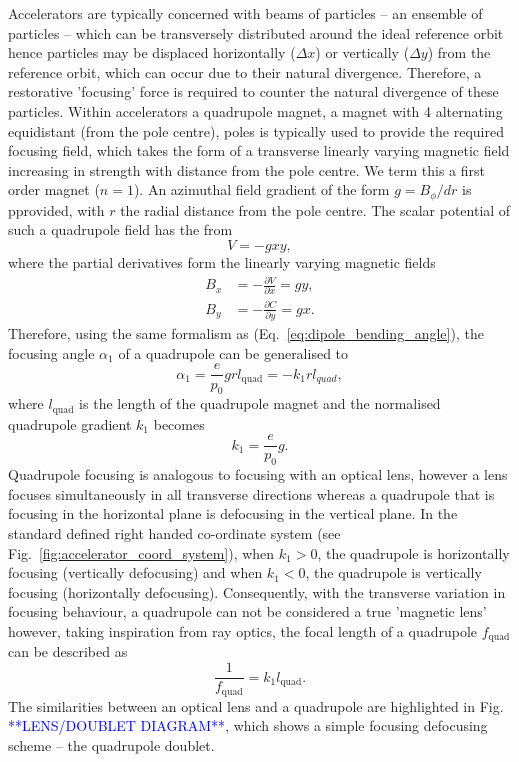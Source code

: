 \documentclass[../main.tex]{subfiles}
\begin{document}
Accelerators are typically concerned with beams of particles -- an ensemble of particles -- which can be transversely distributed around the ideal reference orbit hence particles may be  displaced horizontally ($\Delta x$) or vertically ($\Delta y$) from the reference orbit, which can occur due to their natural divergence. Therefore, a restorative 'focusing' force is required to counter the natural divergence of these particles. Within accelerators a quadrupole magnet, a magnet with 4 alternating equidistant (from the pole centre), poles is typically used to provide the required focusing field, which takes the form of a transverse linearly varying magnetic field increasing in strength with distance from the pole centre. We term this a first order magnet ($n=1$). An azimuthal field gradient of the form $g = B_{\phi}/dr$ is pprovided, with $r$ the radial distance from the pole centre. The scalar potential of such a quadrupole field has the from
\begin{equation}
V = -gxy,
\label{eq:quadrupole_potential}    
\end{equation}
where the partial derivatives form the linearly varying magnetic fields
\begin{align}
B_{x} &= -\frac{\partial V}{\partial x} = gy, \nonumber\\
B_{y} &= -\frac{\partial C}{\partial y} = gx.
\end{align}
Therefore, using the same formalism as (Eq.~\ref{eq:dipole_bending_angle}), the focusing angle $\alpha_{1}$ of a quadrupole can be generalised to
\begin{equation}
\alpha_{1} = \frac{e}{p_{0}}grl_{\mathrm{quad}} = -k_{1}rl_{quad},
\label{eq:quadrupole_focusing_angle}    
\end{equation}
where $l_{\mathrm{quad}}$ is the length of the quadrupole magnet and the normalised quadrupole gradient $k_{1}$ becomes
\begin{equation}
k_{1} = \frac{e}{p_{0}}g.
\label{eq:quadrupole_normalised_gradient}
\end{equation}
Quadrupole focusing is analogous to focusing with an optical lens, however a lens focuses simultaneously in all transverse directions whereas a quadrupole that is focusing in the horizontal plane is defocusing in the vertical plane. In the standard defined right handed co-ordinate system (see Fig.~\ref{fig:accelerator_coord_system}), when $k_{1} > 0$, the quadrupole is horizontally focusing (vertically defocusing) and when $k_{1} < 0$, the quadrupole is vertically focusing (horizontally defocusing). Consequently, with the transverse variation in focusing behaviour, a quadrupole can not be considered a true 'magnetic lens' however, taking inspiration from ray optics, the focal length of a quadrupole $f_{\mathrm{quad}}$ can be described as
\begin{equation}
\frac{1}{f_{\mathrm{quad}}} = k_{1}l_{\mathrm{quad}}.
\label{eq:focal_length_quadrupole}    
\end{equation}
The similarities between an optical lens and a quadrupole are highlighted in Fig. \textcolor{blue}{**LENS/DOUBLET DIAGRAM**}, which shows a simple focusing defocusing scheme -- the quadrupole doublet. 
\end{document}
